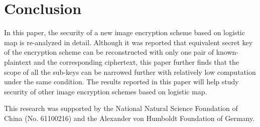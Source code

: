 \documentclass[twocolumn]{svjour3}
\begin{document}
\section{Conclusion}

In this paper, the security of a new image encryption scheme based
on logistic map is re-analyzed in detail. Although it was reported that equivalent
secret key of the encryption scheme can be reconstructed with only one pair of known-plaintext
and the corresponding ciphertext, this paper further finds that
the scope of all the sub-keys can be narrowed further with relatively low computation under the same condition.
The results reported in this paper will help study security of other image encryption schemes
based on logistic map.

\begin{acknowledgements}
This research was supported by the National Natural Science Foundation of China (No. 61100216) and the
Alexander von Humboldt Foundation of Germany.
\end{acknowledgements}



\end{document}
